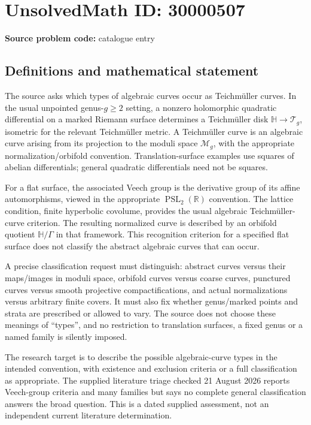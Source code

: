 \documentclass[11pt]{article}
\newcommand{\R}{\mathbb{R}}
\begin{document}
\section*{UnsolvedMath ID: 30000507}
\textbf{Source problem code:} catalogue entry
\subsection{Definitions and mathematical statement}
The source asks which types of algebraic curves occur as Teichm\"uller curves. In the usual unpointed genus-$g\geq2$ setting, a nonzero holomorphic quadratic differential on a marked Riemann surface determines a Teichm\"uller disk $\mathbb H\to\mathcal T_g$, isometric for the relevant Teichm\"uller metric. A Teichm\"uller curve is an algebraic curve arising from its projection to the moduli space $\mathcal M_g$, with the appropriate normalization/orbifold convention. Translation-surface examples use squares of abelian differentials; general quadratic differentials need not be squares.

For a flat surface, the associated Veech group is the derivative group of its affine automorphisms, viewed in the appropriate $\operatorname{PSL}_2(\R)$ convention. The lattice condition, finite hyperbolic covolume, provides the usual algebraic Teichm\"uller-curve criterion. The resulting normalized curve is described by an orbifold quotient $\mathbb H/\Gamma$ in that framework. This recognition criterion for a specified flat surface does not classify the abstract algebraic curves that can occur.

A precise classification request must distinguish: abstract curves versus their maps/images in moduli space, orbifold curves versus coarse curves, punctured curves versus smooth projective compactifications, and actual normalizations versus arbitrary finite covers. It must also fix whether genus/marked points and strata are prescribed or allowed to vary. The source does not choose these meanings of ``types'', and no restriction to translation surfaces, a fixed genus or a named family is silently imposed.

The research target is to describe the possible algebraic-curve types in the intended convention, with existence and exclusion criteria or a full classification as appropriate. The supplied literature triage checked 21 August 2026 reports Veech-group criteria and many families but says no complete general classification answers the broad question. This is a dated supplied assessment, not an independent current literature determination.
\end{document}
